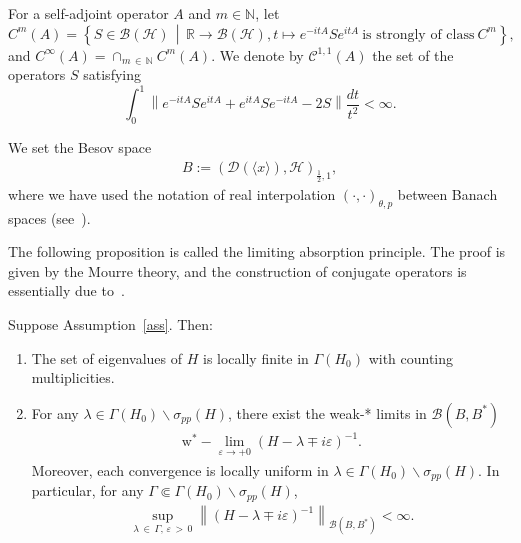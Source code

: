 \documentclass[AHL,Unicode,longabstracts,published]{cedram}
\newcommand{\e}{\varepsilon}
\renewcommand{\l}{\lambda}
\newcommand{\s}{\sigma}
\newcommand{\R}{\mathbb{R}}
\newcommand{\bbN}{\mathbb{N}}
\newcommand{\HS}{\mathcal{H}}
\newcommand{\BS}{\mathcal{B}}
\newcommand{\CS}{\mathcal{C}}
\newcommand{\DS}{\mathcal{D}}
\newcommand{\jap}[1]{\langle #1 \rangle}
\newcommand{\R}{\mathbb{R}}
\newcommand{\HS}{\mathcal{H}}
\begin{document}
For a self-adjoint operator $A$ and $m\in\bbN$, let
\[
C^m(A)=\left\{ S\in\BS(\HS) \,\middle|\, \R\to\BS(\HS),t\mapsto e^{-itA}Se^{itA} \ \text{is strongly of class} \ C^m \right\},
\]
and $C^\infty(A)=\cap_{m\,\in\,\bbN}C^m(A)$. We denote by $\CS^{1,1}(A)$ the set of the operators $S$ satisfying
\[
\int_0^1 \left\| e^{-itA} S e^{itA}+e^{itA} S e^{-itA}-2S \right\| \frac{dt}{t^2} < \infty.
\]


We set the Besov space
\begin{align*}
B:=(\DS(\jap{x}),\HS)_{\frac{1}{2},1},
\end{align*}
where we have used the notation of real interpolation $(\cdot,\cdot)_{\theta,p}$ between Banach spaces (see~\cite[Section~2.1]{A-BdM-G}).

The following proposition is called the limiting absorption principle. The proof is given by the Mourre theory, and the construction of conjugate operators is essentially due to~\cite[Lemma~6.2]{P-R}.

\begin{prop}\label{LAP prop}
Suppose Assumption~\ref{ass}. Then:
\begin{enumerate}
\item\label{prop3.1.1} The set of eigenvalues of $H$ is locally finite in $\Gamma(H_0)$ with counting multiplicities.

\item\label{prop3.1.2} For any $\lambda \in \Gamma(H_0)\backslash \s_{pp}(H)$, there exist the weak-* limits in $\BS(B,B^*)$
\begin{align*}
\operatorname{w^*-}\lim_{\e\to+0} (H-\l\mp i\e)^{-1}.
\end{align*}
Moreover, each convergence is locally uniform in $\l\in\Gamma(H_0)\backslash \s_{pp}(H)$. In particular, for any $\Gamma\Subset\Gamma(H_0)\backslash \s_{pp}(H)$,
\begin{align}\label{LAP}
\sup_{\l\,\in\,\Gamma,\,\e\,>\,0} \left\|(H-\l\mp i\e)^{-1}\right\|_{\BS(B,B^*)} < \infty.
\end{align}
\end{enumerate}
\end{prop}
\end{document}
